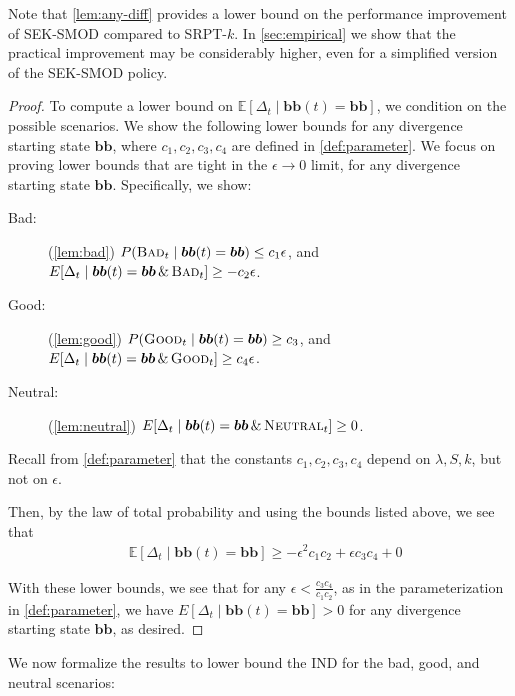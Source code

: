 \documentclass[acmsmall]{acmart}
\newcommand{\E}[1]{\mathbb{E}[#1]}
\newcommand{\bb}{\boldsymbol{b}}
\newcommand{\bbb}{\bb\bb}
\newcommand{\bad}{\textsc{Bad}}
\newcommand{\good}{\textsc{Good}}
\newcommand{\neutral}{\textsc{Neutral}}
\begin{document}
Note that \cref{lem:any-diff} provides a lower bound on the performance improvement of SEK-SMOD compared to SRPT-$k$. In \cref{sec:empirical} we show that the practical improvement may be considerably higher, even for a simplified version of the SEK-SMOD policy.

\begin{proof}
    To compute a lower bound on $\E{\Delta_t \mid \bbb(t) = \bbb}$, we condition on the possible scenarios. We show the following lower bounds for any divergence starting state $\bbb$, where $c_1, c_2, c_3, c_4$ are defined in \cref{def:parameter}. 
    We focus on proving lower bounds that are tight in the $\epsilon\to 0$ limit,  for any divergence starting state $\bbb$. Specifically, we show:
    \begin{description}
        \item[Bad:] (\cref{lem:bad}) $P(\bad_t \mid \bbb(t) = \bbb) \le c_1 \epsilon$, and $E[\Delta_t \mid \bbb(t) = \bbb \,\&\, \bad_t] \ge - c_2 \epsilon$.
        \item [Good:] (\cref{lem:good}) $P(\good_t \mid \bbb(t) = \bbb) \ge c_3$, and $E[\Delta_t \mid \bbb(t) = \bbb \,\&\, \good_t] \ge c_4 \epsilon$.
        \item [Neutral:] (\cref{lem:neutral}) $E[\Delta_t \mid \bbb(t) = \bbb \,\&\, \neutral_t] \ge 0$.
    \end{description}
    Recall from \cref{def:parameter} that the constants $c_1, c_2, c_3, c_4$ depend on $\lambda, S, k$, but not on $\epsilon$.

    Then, by the law of total probability and using the bounds listed above, we see that
    \begin{align*}
        & \E{\Delta_t \mid \bbb(t) = \bbb} \geq -\epsilon^2 c_1c_2 + \epsilon c_3 c_4 + 0
    \end{align*}
    
    With these lower bounds, we see that for any $\epsilon < \frac{c_3 c_4}{c_1 c_2}$, as in the parameterization in \cref{def:parameter}, we have $E[\Delta_t \mid \bbb(t)=\bbb] > 0$ for any divergence starting state $\bbb$, as desired.
\end{proof}


We now formalize the results to lower bound the IND for the bad, good, and neutral scenarios:
\end{document}
